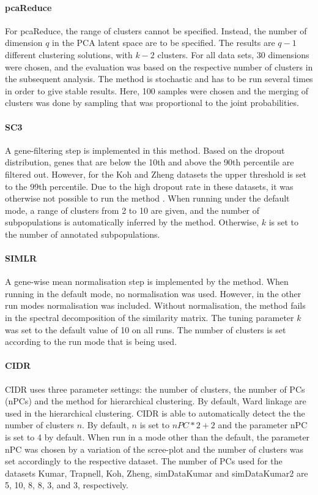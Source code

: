 \documentclass[11pt, a4paper]{article}\usepackage[]{graphicx}\usepackage[]{color}
\begin{document}
\paragraph{pcaReduce}
For pcaReduce, the range of clusters cannot be specified. Instead, the number of dimension $q$ in the PCA latent space are to be specified. The results are $q-1$ different clustering solutions, with $k-2$ clusters. For all data sets, 30 dimensions were chosen, and the evaluation was based on the respective number of clusters in the subsequent analysis. The method is stochastic and has to be run several times in order to give stable results. Here, 100 samples were chosen and the merging of clusters was done by sampling that was proportional to the joint probabilities. 
\paragraph{SC3}
A gene-filtering step is implemented in this method. Based on the dropout distribution, genes that are below the 10th and above the 90th percentile are filtered out. However, for the Koh and Zheng datasets the upper threshold is set to the 99th percentile. Due to the high dropout rate in these datasets, it was otherwise not possible to run the method .
When running under the default mode, a range of clusters from 2 to 10 are given, and the number of subpopulations is automatically inferred by the method. Otherwise, $k$ is set to the number of annotated subpopulations. 
\paragraph{SIMLR}
A gene-wise mean normalisation step is implemented by the method. When running in the default mode, no normalisation was used. However, in the other run modes normalisation was included. Without normalisation, the method fails in the spectral decomposition of the similarity matrix. 
The tuning parameter $k$ was set to the default value of 10 on all runs. The number of clusters is set according to the run mode that is being used.
\paragraph{CIDR}
CIDR uses three parameter settings: the number of clusters, the number of PCs (nPCs) and the method for hierarchical clustering. By default, Ward linkage are used in the hierarchical clustering. CIDR is able to automatically detect the the number of clusters $n$. By default, $n$ is set to $nPC*2+2$ and the parameter nPC is set to 4 by default. When run in a mode other than the default, the parameter nPC was chosen by a variation of the scree-plot and the number of clusters was set accordingly to the respective dataset. 
The number of PCs used for the datasets Kumar, Trapnell, Koh, Zheng, simDataKumar and simDataKumar2 are  5, 10, 8, 8, 3, and 3, respectively.
\end{document}
